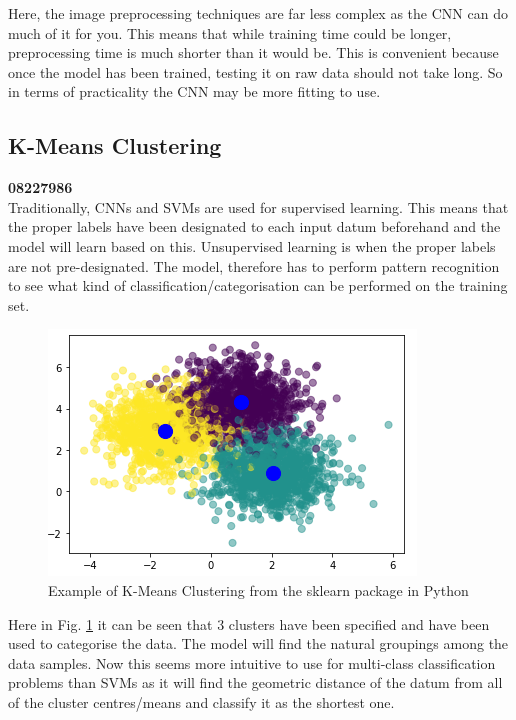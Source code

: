 \documentclass{article}
\begin{document}
    Here, the image preprocessing techniques are far less complex as the CNN can do much of it for you. This means that while training time could be longer, preprocessing time is much shorter than it would be. This is convenient because once the model has been trained, testing it on raw data should not take long. So in terms of practicality the CNN may be more fitting to use.\\
    
    \subsection{K-Means Clustering}
    \textbf{08227986}\\
    Traditionally, CNNs and SVMs are used for supervised learning. This means that the proper labels have been designated to each input datum beforehand and the model will learn based on this. Unsupervised learning is when the proper labels are not pre-designated. The model, therefore has to perform pattern recognition to see what kind of classification/categorisation can be performed on the training set.\\
    \begin{figure}[htb]
    	\centering
    	\includegraphics[scale=0.7]{Figures/Example_KMeans.PNG}
    	\caption{Example of K-Means Clustering from the sklearn package in Python}
    	\label{fig:example_kmeans}
    \end{figure} 

	Here in Fig. \ref{fig:example_kmeans} it can be seen that 3 clusters have been specified and have been used to categorise the data. The model will find the natural groupings among the data samples. Now this seems more intuitive to use for multi-class classification problems than SVMs as it will find the geometric distance of the datum from all of the cluster centres/means and classify it as the shortest one.\\
	
\end{document}
